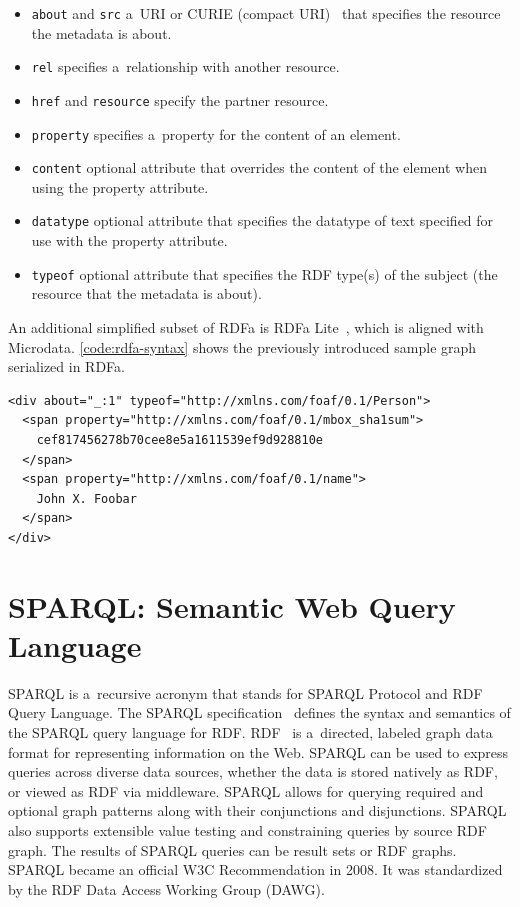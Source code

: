 \begin{itemize}
  \item \texttt{about} and \texttt{src} a~URI or
        CURIE (compact URI)~\cite{birbeck2007curie}
        that specifies the resource
        the metadata is about.
  \item \texttt{rel} specifies a~relationship with
        another resource.
  \item \texttt{href} and \texttt{resource} specify
        the partner resource.
  \item \texttt{property} specifies a~property for
        the content of an element.
  \item \texttt{content} optional attribute that overrides
        the content of the element when using
        the property attribute.
  \item \texttt{datatype} optional attribute that
        specifies the datatype of text specified
        for use with the property attribute.
  \item \texttt{typeof} optional attribute that specifies
        the RDF type(s) of the subject (the resource
        that the metadata is about).
\end{itemize}

An additional simplified subset of RDFa is RDFa Lite~\cite{sporny2012rdfaalite}, which is aligned with Microdata.
\autoref{code:rdfa-syntax} shows the previously introduced
sample graph serialized in RDFa.

\begin{lstlisting}[caption={Sample graph in RDFa syntax},
  label={code:rdfa-syntax}]
<div about="_:1" typeof="http://xmlns.com/foaf/0.1/Person">           
  <span property="http://xmlns.com/foaf/0.1/mbox_sha1sum">
    cef817456278b70cee8e5a1611539ef9d928810e
  </span> 
  <span property="http://xmlns.com/foaf/0.1/name">
    John X. Foobar
  </span>
</div> 
\end{lstlisting}

\section{SPARQL: Semantic Web Query Language}

SPARQL is a~recursive acronym that stands for
SPARQL Protocol and RDF Query Language.
The SPARQL specification~\cite{prudhommeaux2008sparql}
defines the syntax and semantics
of the SPARQL query language for RDF.
RDF~\cite{klyne2004rdf} is a~directed, labeled
graph data format for representing information on the Web.
SPARQL can be used to express queries
across diverse data sources,
whether the data is stored natively as RDF,
or viewed as RDF via middleware.
SPARQL allows for querying required
and optional graph patterns
along with their conjunctions and disjunctions.
SPARQL also supports extensible value testing
and constraining queries by source RDF graph.
The results of SPARQL queries can be result sets or RDF graphs.
SPARQL became an official W3C Recommendation in 2008.
It was standardized by the RDF Data Access Working Group (DAWG).

